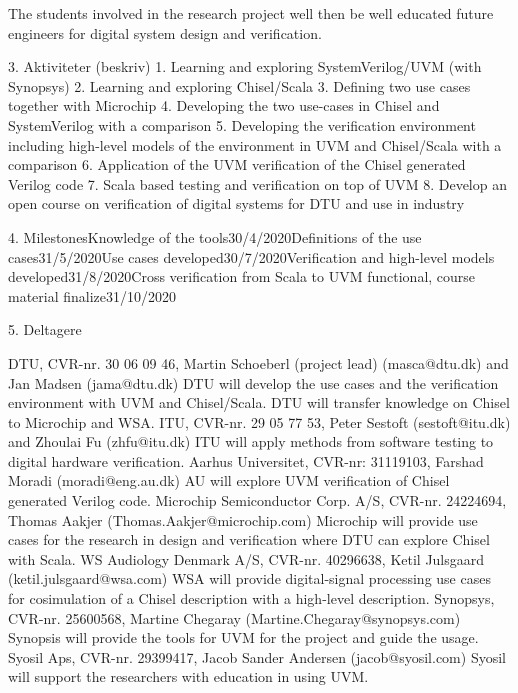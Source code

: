 \documentclass[fleqn,12pt]{article}
\begin{document}
The students involved in the research project well then be well educated future engineers for digital system design and verification.



3. Aktiviteter (beskriv) 1. Learning and exploring SystemVerilog/UVM (with Synopsys)
2. Learning and exploring Chisel/Scala
3. Defining two use cases together with Microchip
4. Developing the two use-cases in Chisel and SystemVerilog with a comparison
5. Developing the verification environment including high-level models of the environment in UVM and Chisel/Scala with a comparison
6. Application of the UVM verification of the Chisel generated Verilog code
7. Scala based testing and verification on top of UVM
8. Develop an open course on verification of digital systems for DTU and use in industry




4. MilestonesKnowledge of the tools30/4/2020Definitions of the use cases31/5/2020Use cases developed30/7/2020Verification and high-level models developed31/8/2020Cross verification from Scala to UVM functional, course material finalize31/10/2020

5. Deltagere



DTU, CVR-nr. 30 06 09 46, Martin Schoeberl (project lead) (masca@dtu.dk) and Jan Madsen (jama@dtu.dk)
DTU will develop the use cases and the verification environment with UVM and Chisel/Scala. DTU will transfer knowledge on Chisel to Microchip and WSA.
ITU, CVR-nr. 29 05 77 53, Peter Sestoft (sestoft@itu.dk) and Zhoulai Fu (zhfu@itu.dk)
ITU will apply methods from software testing to digital hardware verification.
Aarhus Universitet, CVR-nr: 31119103, Farshad Moradi (moradi@eng.au.dk)
AU will explore UVM verification of Chisel generated Verilog code.
Microchip Semiconductor Corp. A/S, CVR-nr. 24224694, Thomas Aakjer (Thomas.Aakjer@microchip.com)
Microchip will provide use cases for the research in design and verification where DTU can explore Chisel with Scala.
WS Audiology Denmark A/S, CVR-nr. 40296638, Ketil Julsgaard (ketil.julsgaard@wsa.com)
WSA will provide digital-signal processing use cases for cosimulation of a Chisel description with a high-level description.
Synopsys, CVR-nr. 25600568, Martine Chegaray (Martine.Chegaray@synopsys.com)
Synopsis will provide the tools for UVM for the project and guide the usage.
Syosil Aps, CVR-nr. 29399417, Jacob Sander Andersen (jacob@syosil.com)
Syosil will support the researchers with education in using UVM.
\end{document}
